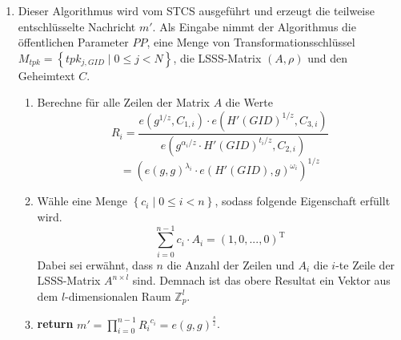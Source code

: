 \begin{enumerate}
	\item {} Dieser Algorithmus
		wird vom STCS ausgeführt und erzeugt die teilweise entschlüsselte Nachricht
		$m'$. Als Eingabe nimmt der Algorithmus die öffentlichen Parameter $PP$,
		eine Menge von Transformationsschlüssel $M_{tpk} = \left\{tpk_{j, GID}
		\;\vert\; 0 \leq j < N\right\}$, die LSSS-Matrix $\left(A, \rho\right)$ und
		den Geheimtext $C$.
		\begin{enumerate}
			\item Berechne für alle Zeilen der Matrix $A$ die Werte
				\begin{equation*}
					R_i = \frac{e(g^{1/z}, C_{1,i}) \cdot e(H'(GID)^{1/z},
					C_{3,i})}{e(g^{\alpha_i / z} \cdot H'(GID)^{t_i/z}, C_{2, i})}
				\end{equation*}
				\begin{equation*}
					= (e(g,g)^{\lambda_i} \cdot e(H'(GID), g)^{\omega_i})^{1/z}
				\end{equation*}
			\item Wähle eine Menge $\left\{c_i \;\vert\; 0 \leq i < n\right\}$, sodass
				folgende Eigenschaft erfüllt wird.
				\begin{equation*}
					\sum_{i=0}^{n-1} c_i \cdot A_i = \left(1, 0, ..., 0\right)^\mathrm{T}
				\end{equation*}
				Dabei sei erwähnt, dass $n$ die Anzahl der Zeilen und $A_i$ die $i$-te
				Zeile der LSSS-Matrix $A^{n \times l}$ sind. Demnach ist das obere
				Resultat ein Vektor aus dem $l$-dimensionalen Raum $\mathbb{Z}_p^l$.
			\item \textbf{return} $m' = \prod\limits_{i=0}^{n-1} {R_i}^{c_i} = e(g,
				g)^{\frac{s}{z}}$.
		\end{enumerate}


\end{enumerate}
